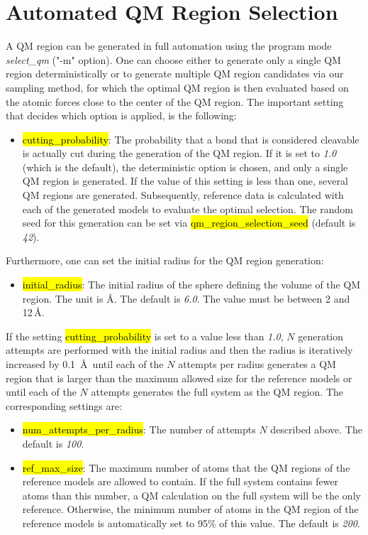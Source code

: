 \documentclass[]{tufte-book}
\begin{document}
{{\begin{itemize}
\end{itemize}

\chapter{Automated QM Region Selection}\label{ch:select_qm}

A QM region can be generated in full automation using the program mode \textit{select\_qm} ("-m" option). One can choose either to generate only a single QM region deterministically or to generate multiple QM region candidates via our sampling method, for which the optimal QM region is then evaluated based on the atomic forces close to the center of the QM region.\cite{brunken21} The important setting that decides which option is applied, is the following:

\begin{itemize}
\item \hl{cutting\_probability}: The probability that a bond that is considered cleavable is actually cut during the generation of the QM region. If it is set to \textit{1.0} (which is the default), the deterministic option is chosen, and only a single QM region is generated.
If the value of this setting is less than one, several QM regions are generated. Subsequently, reference data is calculated with each of the generated models to evaluate the optimal selection. The random seed for this generation can be set via \hl{qm\_region\_selection\_seed} (default is \textit{42}).
\end{itemize}

Furthermore, one can set the initial radius for the QM region generation:

\begin{itemize}
\item \hl{initial\_radius}:  The initial radius of the sphere defining the volume of the QM region. The unit is \AA. The default is \textit{6.0}. The value must be between 2 and 12\,\AA.
\end{itemize}

If the setting \hl{cutting\_probability} is set to a value less than \textit{1.0}, $N$ generation attempts are performed with the initial radius and then the radius is iteratively increased by 0.1~\AA~until each of the $N$ attempts per radius generates a QM region that is larger than the maximum allowed size for the reference models or until each of the $N$ attempts generates the full system as the QM region. The corresponding settings are:
\begin{itemize}
\item \hl{num\_attempts\_per\_radius}: The number of attempts $N$ described above. The default is \textit{100}.
\item \hl{ref\_max\_size}: The maximum number of atoms that the QM regions of the reference models are allowed to contain. If the full system contains fewer atoms than this number, a QM calculation on the full system will be the only reference. Otherwise, the minimum number of atoms in the QM region of the reference models is automatically set to 95\% of this value. The default is \textit{200}.
\end{itemize}

}}
\end{document}
